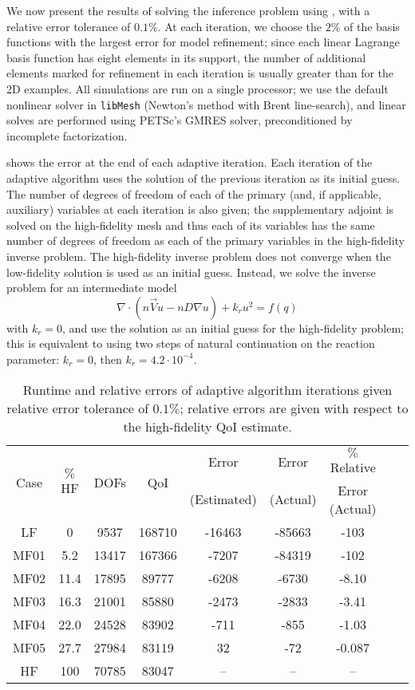 We now present the results of solving the inference problem using , with a relative error tolerance of $0.1\%$. At each iteration, we choose the $2\%$ of the basis functions with the largest error for model refinement; since each linear Lagrange basis function has eight elements in its support, the number of additional elements marked for refinement in each iteration is usually greater than for the 2D examples. All simulations are run on a single processor; we use the default nonlinear solver in \texttt{libMesh} \cite{libMeshPaper} (Newton's method with Brent line-search), and linear solves are performed using PETSc's \cite{petsc-user-ref} GMRES solver, preconditioned by incomplete factorization.

 shows the error at the end of each adaptive iteration. Each iteration of the adaptive algorithm uses the solution of the previous iteration as its initial guess. The number of degrees of freedom of each of the primary (and, if applicable, auxiliary) variables at each iteration is also given; the supplementary adjoint is solved on the high-fidelity mesh and thus each of its variables has the same number of degrees of freedom as each of the primary variables in the high-fidelity inverse problem. The high-fidelity inverse problem does not converge when the low-fidelity solution is used as an initial guess. Instead, we solve the inverse problem for an intermediate model
%
\begin{equation}
\nabla\cdot(n\vec{V}u - nD\nabla u) + k_ru^2 = f(q)
\end{equation}
%
with $k_r=0$, and use the solution as an initial guess for the high-fidelity problem; this is equivalent to using two steps of natural continuation on the reaction parameter: $k_r=0$, then $k_r=4.2\cdot10^{-4}$.
%
\begin{table}[htbp]
\centering
\begin{tabular}{|c|c|c|c|c|c|c|c|c|}
\hline
\multirow{2}{*}{Case} & \multirow{2}{*}{$\%$HF} & \multirow{2}{*}{DOFs} & \multirow{2}{*}{QoI} & Error & Error & $\%$ Relative \\
& & & & (Estimated) & (Actual) & Error (Actual)  \\ \hline
LF   & 0    & 9537  & 168710 & -16463 & -85663 & -103    \\
MF01 & 5.2  & 13417 & 167366 & -7207  & -84319 & -102    \\
MF02 & 11.4 & 17895 & 89777  & -6208  & -6730  & -8.10   \\
MF03 & 16.3 & 21001 & 85880  & -2473  & -2833  & -3.41   \\
MF04 & 22.0 & 24528 & 83902  & -711   & -855   & -1.03   \\
MF05 & 27.7 & 27984 & 83119  & 32     & -72    & -0.087  \\
HF   & 100  & 70785 & 83047  & --     & --     & --    \\ \hline
\end{tabular}
\caption{Runtime and relative errors of adaptive algorithm iterations given relative error tolerance of $0.1\%$; relative errors are given with respect to the high-fidelity QoI estimate.}
\label{tab:ref3D_diffmesh}
\end{table}
%

